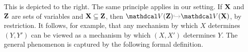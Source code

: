 This is depicted to the right.
%
The same principle applies in our setting.
If $\mathbf X$ and $\mathbf Z$ are sets of variables and $\mathbf X \subseteq \mathbf Z$, then 
$\V(\mat Z) {\color{gray}\hookrightarrow} \V(\mat X)$, by restriction. 
It follows, for example, that
    any mechanism by which $X$ determines $(Y,Y')$ can be viewed
        as a mechanism by which $(X,X')$ determines $Y$. 
The general phenomenon is captured by the following
    \unskip formal definition.

